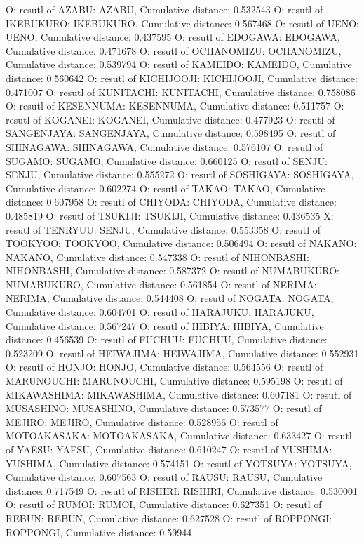 O: resutl of AZABU: AZABU, Cumulative distance: 0.532543
O: resutl of IKEBUKURO: IKEBUKURO, Cumulative distance: 0.567468
O: resutl of UENO: UENO, Cumulative distance: 0.437595
O: resutl of EDOGAWA: EDOGAWA, Cumulative distance: 0.471678
O: resutl of OCHANOMIZU: OCHANOMIZU, Cumulative distance: 0.539794
O: resutl of KAMEIDO: KAMEIDO, Cumulative distance: 0.560642
O: resutl of KICHIJOOJI: KICHIJOOJI, Cumulative distance: 0.471007
O: resutl of KUNITACHI: KUNITACHI, Cumulative distance: 0.758086
O: resutl of KESENNUMA: KESENNUMA, Cumulative distance: 0.511757
O: resutl of KOGANEI: KOGANEI, Cumulative distance: 0.477923
O: resutl of SANGENJAYA: SANGENJAYA, Cumulative distance: 0.598495
O: resutl of SHINAGAWA: SHINAGAWA, Cumulative distance: 0.576107
O: resutl of SUGAMO: SUGAMO, Cumulative distance: 0.660125
O: resutl of SENJU: SENJU, Cumulative distance: 0.555272
O: resutl of SOSHIGAYA: SOSHIGAYA, Cumulative distance: 0.602274
O: resutl of TAKAO: TAKAO, Cumulative distance: 0.607958
O: resutl of CHIYODA: CHIYODA, Cumulative distance: 0.485819
O: resutl of TSUKIJI: TSUKIJI, Cumulative distance: 0.436535
X: resutl of TENRYUU: SENJU, Cumulative distance: 0.553358
O: resutl of TOOKYOO: TOOKYOO, Cumulative distance: 0.506494
O: resutl of NAKANO: NAKANO, Cumulative distance: 0.547338
O: resutl of NIHONBASHI: NIHONBASHI, Cumulative distance: 0.587372
O: resutl of NUMABUKURO: NUMABUKURO, Cumulative distance: 0.561854
O: resutl of NERIMA: NERIMA, Cumulative distance: 0.544408
O: resutl of NOGATA: NOGATA, Cumulative distance: 0.604701
O: resutl of HARAJUKU: HARAJUKU, Cumulative distance: 0.567247
O: resutl of HIBIYA: HIBIYA, Cumulative distance: 0.456539
O: resutl of FUCHUU: FUCHUU, Cumulative distance: 0.523209
O: resutl of HEIWAJIMA: HEIWAJIMA, Cumulative distance: 0.552931
O: resutl of HONJO: HONJO, Cumulative distance: 0.564556
O: resutl of MARUNOUCHI: MARUNOUCHI, Cumulative distance: 0.595198
O: resutl of MIKAWASHIMA: MIKAWASHIMA, Cumulative distance: 0.607181
O: resutl of MUSASHINO: MUSASHINO, Cumulative distance: 0.573577
O: resutl of MEJIRO: MEJIRO, Cumulative distance: 0.528956
O: resutl of MOTOAKASAKA: MOTOAKASAKA, Cumulative distance: 0.633427
O: resutl of YAESU: YAESU, Cumulative distance: 0.610247
O: resutl of YUSHIMA: YUSHIMA, Cumulative distance: 0.574151
O: resutl of YOTSUYA: YOTSUYA, Cumulative distance: 0.607563
O: resutl of RAUSU: RAUSU, Cumulative distance: 0.717549
O: resutl of RISHIRI: RISHIRI, Cumulative distance: 0.530001
O: resutl of RUMOI: RUMOI, Cumulative distance: 0.627351
O: resutl of REBUN: REBUN, Cumulative distance: 0.627528
O: resutl of ROPPONGI: ROPPONGI, Cumulative distance: 0.59944

